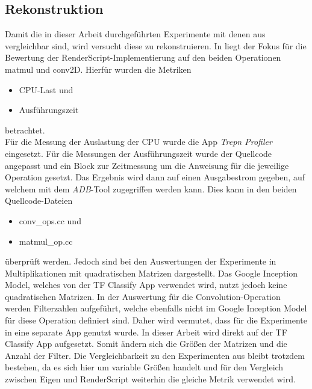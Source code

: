 \subsection{Rekonstruktion}
\label{subsec:rekonstruktion}
Damit die in dieser Arbeit durchgeführten Experimente mit denen aus \cite{rstensorflow2017} vergleichbar sind, wird versucht diese zu rekonstruieren. In \cite{rstensorflow2017} liegt der Fokus für die Bewertung der RenderScript-Implementierung auf den beiden Operationen matmul und conv2D. Hierfür wurden die Metriken
\begin{itemize}
	\item CPU-Last und
	\item Ausführungszeit
\end{itemize}
betrachtet. 
\\
Für die Messung der Auslastung der CPU wurde die App \textit{Trepn Profiler} eingesetzt. Für die Messungen der Ausführungszeit wurde der Quellcode angepasst und ein Block zur Zeitmessung um die Anweisung für die jeweilige Operation gesetzt. Das Ergebnis wird dann auf einen Ausgabestrom gegeben, auf welchem mit dem \textit{ADB}-Tool zugegriffen werden kann. Dies kann in den beiden Quellcode-Dateien 
\begin{itemize}
	\item conv\_ops.cc und
	\item matmul\_op.cc
\end{itemize}
überprüft werden. Jedoch sind bei den Auswertungen der Experimente in \cite{rstensorflow2017} Multiplikationen mit quadratischen Matrizen dargestellt. Das Google Inception Model, welches von der TF Classify App verwendet wird, nutzt jedoch keine quadratischen Matrizen. In der Auswertung für die Convolution-Operation werden Filterzahlen aufgeführt, welche ebenfalls nicht im Google Inception Model für diese Operation definiert sind. Daher wird vermutet, dass für die Experimente in \cite{rstensorflow2017} eine separate App genutzt wurde. In dieser Arbeit wird direkt auf der TF Classify App aufgesetzt. Somit ändern sich die Größen der Matrizen und die Anzahl der Filter. Die Vergleichbarkeit zu den Experimenten aus \cite{rstensorflow2017} bleibt trotzdem bestehen, da es sich hier um variable Größen handelt und für den Vergleich zwischen Eigen und RenderScript weiterhin die gleiche Metrik verwendet wird. 

